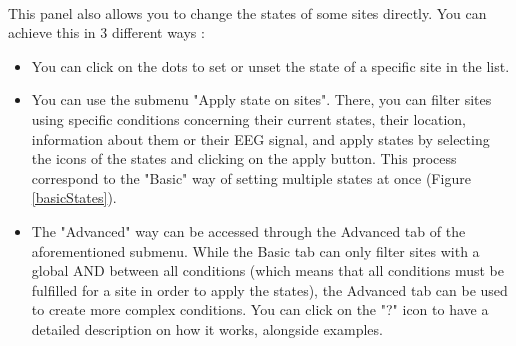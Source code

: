 \documentclass[a4paper]{article}
\begin{document}
\paragraph{} This panel also allows you to change the states of some sites directly. You can achieve this in 3 different ways :
\begin{itemize}
\item You can click on the dots to set or unset the state of a specific site in the list.
\item You can use the submenu "Apply state on sites". There, you can filter sites using specific conditions concerning their current states, their location, information about them or their EEG signal, and apply states by selecting the icons of the states and clicking on the apply button. This process correspond to the "Basic" way of setting multiple states at once (Figure \ref{basicStates}).
\item The "Advanced" way can be accessed through the Advanced tab of the aforementioned submenu. While the Basic tab can only filter sites with a global AND between all conditions (which means that all conditions must be fulfilled for a site in order to apply the states), the Advanced tab can be used to create more complex conditions. You can click on the "?" icon to have a detailed description on how it works, alongside examples.
\end{itemize}
\end{document}

